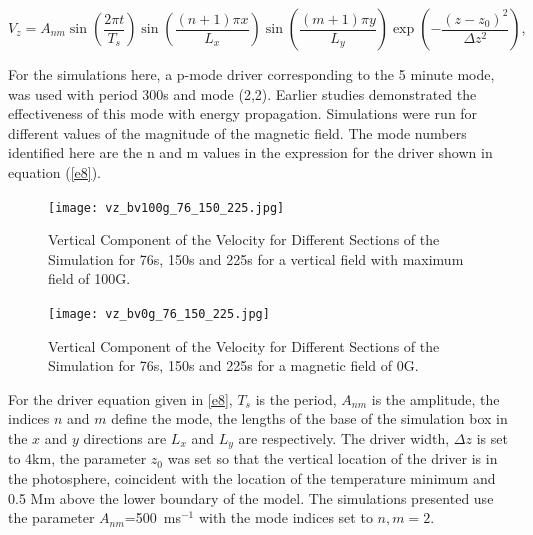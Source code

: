 \documentclass[linenumbers]{aastex63}
\begin{document}
\begin{equation}
 V_{z}  =  A_{nm} \sin\left(\frac{2\pi t}{T_s} \right)\sin\left(  \frac{(n+1)\pi x}{L_x} \right)  
 \sin\left(\frac{(m+1)\pi y}{L_y} \right) \exp\left( -\frac{(z-z_0)^2}{\Delta z^2} \right),
\label{e8}
\end{equation}

For the  simulations here, a p-mode driver corresponding to the 5 minute mode, was used with period 300s and mode (2,2). Earlier studies demonstrated the effectiveness of this mode with energy propagation. Simulations were run for different values of the magnitude of the magnetic field. The mode numbers identified here are the n and m values in the expression for the driver shown in equation (\ref{e8}).


\begin{figure}\label{vzplot_bv100g_76_150_225}
\texttt{[image: vz\_bv100g\_76\_150\_225.jpg]}
\caption{Vertical Component of the Velocity for Different Sections of the Simulation for 76s, 150s and 225s for a vertical field with maximum field of 100G.}
\end{figure}



\begin{figure}\label{vzplot_bv0g_76_150_225}
\texttt{[image: vz\_bv0g\_76\_150\_225.jpg]}
\caption{Vertical Component of the Velocity for Different Sections of the Simulation for 76s, 150s and 225s for a magnetic field of 0G.}
\end{figure}





For the driver equation given in \ref{e8}, $T_{s}$ is the period, $A_{nm}$ is the amplitude, the indices $n$ and $m$ define the mode, the lengths of the base of the simulation box in the $x$ and $y$ directions are $L_{x}$ and $L_{y}$ are  respectively. The driver width, $\Delta z$ is set to $4$km, the parameter $z_{0}$ was set so that the vertical location of the driver is in the photosphere, coincident with the location of the temperature minimum and 0.5 Mm above the lower boundary of the model. The simulations presented use the parameter $A_{nm}$=500\, ms$^{-1}$ with the mode indices set to $n,m=2$. 
\end{document}
